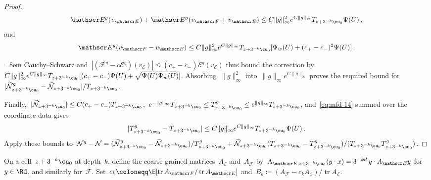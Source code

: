 \documentclass[11pt]{amsart}
\begin{document}
\begin{proof}
\begin{equation*}
	\mathscr E^g(v_{\mathscr E})+\mathscr E^g(v_{\mathscr F}+v_{\mathscr E})\leq C\|g\|_\infty^2e^{C\|g\|_\infty}T_{z+3^{-k}\cu_0}\Psi(U)\,,
\end{equation*}
and
\begin{equation*}
	\mathscr E^g(v_{\mathscr F}-v_{\mathscr E})\leq C\|g\|_\infty^2e^{C\|g\|_\infty}T_{z+3^{-k}\cu_0}[\Psi_w(U)+(c_+-c_-)^2\Psi(U)]\,.
\end{equation*}
{\emergencystretch=8em Cauchy--Schwarz and~$|(\mathscr F^g-c\mathscr E^g)(v_{\mathscr E})|\leq(c_+-c_-)\mathscr E^g(v_{\mathscr E})$ thus bound the correction by~$C\|g\|_\infty^2e^{C\|g\|_\infty}T_{z+3^{-k}\cu_0}[(c_+-c_-)\Psi(U)+\sqrt{\Psi(U)\Psi_w(U)}]$. Absorbing~$\|g\|_\infty^2$ into~$\|g\|_\infty e^{C\|g\|_\infty}$ proves the required bound for~$|\widetilde{\mathcal N}_{z+3^{-k}\cu_0}^g-\allowbreak \widetilde{\mathcal N}_{z+3^{-k}\cu_0}|/T_{z+3^{-k}\cu_0}$.\par}

\smallskip

Finally,~$|\widetilde{\mathcal N}_{z+3^{-k}\cu_0}|\leq C(c_+-c_-)T_{z+3^{-k}\cu_0}$,~$e^{-\|g\|_\infty}T_{z+3^{-k}\cu_0}\leq T_{z+3^{-k}\cu_0}^g\leq e^{\|g\|_\infty}T_{z+3^{-k}\cu_0}$, and~\eqref{eq:mfd-14} summed over the coordinate data gives
\begin{equation*}
	|T_{z+3^{-k}\cu_0}^g-T_{z+3^{-k}\cu_0}|\leq C\|g\|_\infty e^{C\|g\|_\infty}T_{z+3^{-k}\cu_0}\Psi(U)\,.
\end{equation*}
Apply these bounds to~$\mathcal N^g-\mathcal N=(\widetilde{\mathcal N}_{z+3^{-k}\cu_0}^g-\widetilde{\mathcal N}_{z+3^{-k}\cu_0})/T_{z+3^{-k}\cu_0}^g +\widetilde{\mathcal N}_{z+3^{-k}\cu_0}(T_{z+3^{-k}\cu_0}-T_{z+3^{-k}\cu_0}^g)/(T_{z+3^{-k}\cu_0}T_{z+3^{-k}\cu_0}^g)$.
\end{proof}

On a cell~$z+3^{-k}\cu_0$ at depth~$k$, define the coarse-grained matrices~$A_{\mathscr E}$ and~$A_{\mathscr F}$ by~$\Lambda_{\mathscr E,z+3^{-k}\cu_0}(y\cdot x)=3^{-kd}\,y\cdot A_{\mathscr E}y$ for~$y\in\Rd$, and similarly for~$\mathscr F$. Set~$c_k\coloneqq\E[\operatorname{tr}A_{\mathscr F}/\operatorname{tr}A_{\mathscr E}]$ and~$B_k\coloneqq(A_{\mathscr F}-c_kA_{\mathscr E})/\operatorname{tr}A_{\mathscr E}$.
\end{document}
